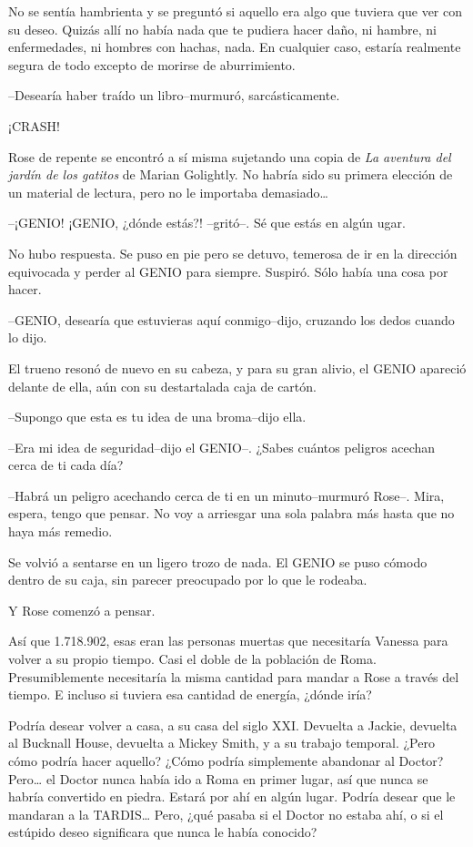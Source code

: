 No se sentía hambrienta y se preguntó si aquello era algo que tuviera
que ver con su deseo. Quizás allí no había nada que te pudiera hacer
daño, ni hambre, ni enfermedades, ni hombres con hachas, nada. En
cualquier caso, estaría realmente segura de todo excepto de morirse de
aburrimiento.

--Desearía haber traído un libro--murmuró, sarcásticamente.

¡CRASH!

Rose de repente se encontró a sí misma sujetando una copia de \emph{La
aventura del jardín de los gatitos} de Marian Golightly. No habría sido
su primera elección de un material de lectura, pero no le importaba
demasiado\ldots{}

--¡GENIO! ¡GENIO, ¿dónde estás?! --gritó--. Sé que estás en algún ugar.

No hubo respuesta. Se puso en pie pero se detuvo, temerosa de ir en la
dirección equivocada y perder al GENIO para siempre. Suspiró. Sólo había
una cosa por hacer.

--GENIO, desearía que estuvieras aquí conmigo--dijo, cruzando los dedos
cuando lo dijo.

El trueno resonó de nuevo en su cabeza, y para su gran alivio, el GENIO
apareció delante de ella, aún con su destartalada caja de cartón.

--Supongo que esta es tu idea de una broma--dijo ella.

--Era mi idea de seguridad--dijo el GENIO--. ¿Sabes cuántos peligros
acechan cerca de ti cada día?

--Habrá un peligro acechando cerca de ti en un minuto--murmuró Rose--.
Mira, espera, tengo que pensar. No voy a arriesgar una sola palabra más
hasta que no haya más remedio.

Se volvió a sentarse en un ligero trozo de nada. El GENIO se puso cómodo
dentro de su caja, sin parecer preocupado por lo que le rodeaba.

Y Rose comenzó a pensar.

Así que 1.718.902, esas eran las personas muertas que necesitaría
Vanessa para volver a su propio tiempo. Casi el doble de la población de
Roma. Presumiblemente necesitaría la misma cantidad para mandar a Rose a
través del tiempo. E incluso si tuviera esa cantidad de energía, ¿dónde
iría?

Podría desear volver a casa, a su casa del siglo XXI. Devuelta a Jackie,
devuelta al Bucknall House, devuelta a Mickey Smith, y a su trabajo
temporal. ¿Pero cómo podría hacer aquello? ¿Cómo podría simplemente
abandonar al Doctor?\\Pero\ldots{} el Doctor nunca había ido a Roma en
primer lugar, así que nunca se habría convertido en piedra. Estará por
ahí en algún lugar. Podría desear que le mandaran a la TARDIS\ldots{}
Pero, ¿qué pasaba si el Doctor no estaba ahí, o si el estúpido deseo
significara que nunca le había conocido?

